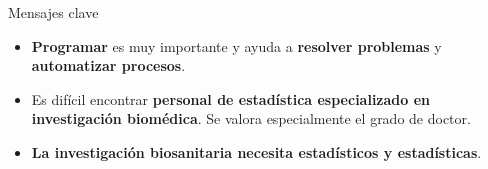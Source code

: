 \documentclass{beamer}
\begin{document}

\begin{frame}\frametitle{}
	\begin{block}{Mensajes clave}
		\begin{itemize}
			\item \textbf{Programar} es muy importante y ayuda a \textbf{resolver problemas} y \textbf{automatizar procesos}.\\[2ex]
			\item Es difícil encontrar \textbf{personal de estadística especializado en investigación biomédica}. Se valora especialmente el grado de doctor.\\[2ex]
			\item \textbf{La investigación biosanitaria necesita estadísticos y estadísticas}.\\[2ex]
		\end{itemize}
	\end{block}
\end{frame}

\end{document}
